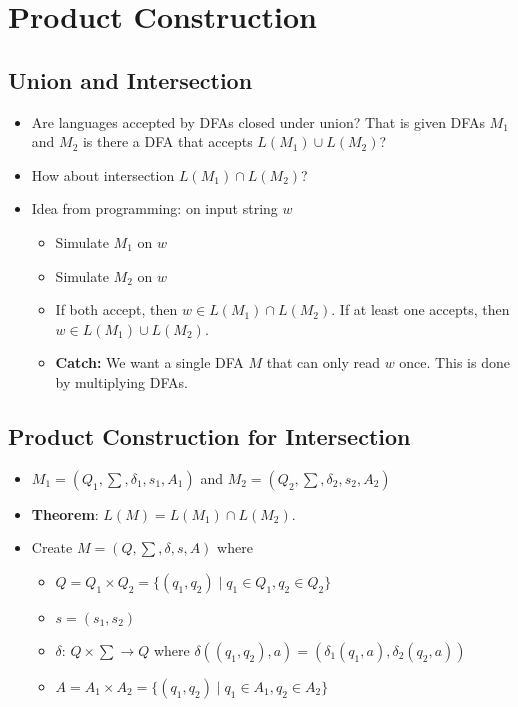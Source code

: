 \section{Product Construction}

\subsection{Union and Intersection}
\begin{itemize}
    \item Are languages accepted by DFAs closed under union? That is given DFAs $M_1$ and $M_2$ is there a DFA that accepts $L(M_1) \cup L(M_2)$?
    \item How about intersection $L(M_1) \cap L(M_2)$?
    \item Idea from programming: on input string $w$
    \begin{itemize}
        \item Simulate $M_1$ on $w$
        \item Simulate $M_2$ on $w$
        \item If both accept, then $w \in L(M_1) \cap L(M_2)$. If at least one accepts, then $w \in L(M_1) \cup L(M_2)$.
        \item \textbf{Catch:} We want a single DFA $M$ that can only read $w$ once. This is done by multiplying DFAs.
    \end{itemize}
\end{itemize}

\subsection{Product Construction for Intersection}
\begin{itemize}
    \item $M_1 = (Q_1, \sum, \delta_1, s_1, A_1)$ and $M_2 = (Q_2, \sum, \delta_2, s_2, A_2)$
    \item \textbf{Theorem}: $L(M) = L(M_1) \cap L(M_2)$.
    \item Create $M = (Q, \sum, \delta, s, A)$ where
    \begin{itemize}
        \item $Q = Q_1 \times Q_2 = \{ (q_1, q_2) \mid q_1 \in Q_1, q_2 \in Q_2 \}$
        \item $s = (s_1, s_2)$
        \item $\delta$: $Q \times \sum \rightarrow Q$ where $\delta((q_1, q_2), a) = (\delta_1(q_1, a), \delta_2(q_2, a))$
        \item $A = A_1 \times A_2 = \{ (q_1, q_2) \mid q_1 \in A_1, q_2 \in A_2 \}$
    \end{itemize}
\end{itemize}

